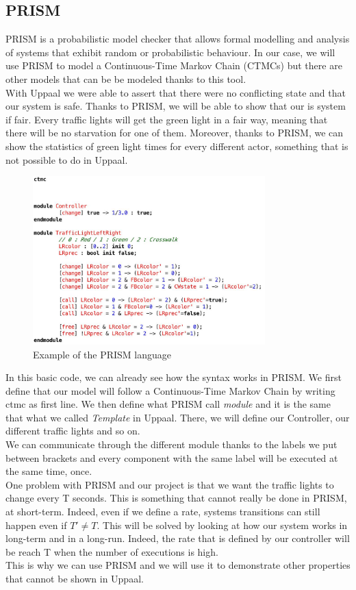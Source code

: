  \subsection{PRISM}
 PRISM is a probabilistic model checker that allows formal modelling and analysis of systems that exhibit random or probabilistic behaviour. In our case, we will use PRISM to model a Continuous-Time Markov Chain (CTMCs) but there are other models that can be be modeled thanks to this tool. \\
 With Uppaal we were able to assert that there were no conflicting state and that our system is safe. Thanks to PRISM, we will be able to show that our is system if fair. Every traffic lights will get the green light in a fair way, meaning that there will be no starvation for one of them. Moreover, thanks to PRISM, we can show the statistics of green light times for every different actor, something that is not possible to do in Uppaal.
 
\begin{figure}[H]\label{fig:prism}
  \begin{center}
    \includegraphics[width=0.8\textwidth]{picture/prism.png}
    \caption{Example of the PRISM language}
  \end{center}
\end{figure} 

\noindent In this basic code, we can already see how the syntax works in PRISM. We first define that our model will follow a Continuous-Time Markov Chain by writing ctmc as first line. We then define what PRISM call \textit{module} and it is the same that what we called \textit{Template} in Uppaal. There, we will define our Controller, our different traffic lights and so on. \\
We can communicate through the different module thanks to the labels we put between brackets and every component with the same label will be executed at the same time, once. \\
One problem with PRISM and our project is that we want the traffic lights to change every T seconds. This is something that cannot really be done in PRISM, at short-term. Indeed, even if we define a rate, systems transitions can still happen even if $T' \ne T $. This will be solved by looking at how our system works in long-term and in a long-run. Indeed, the rate that is defined by our controller will be reach T when the number of executions is high. \\ 
This is why we can use PRISM and we will use it to demonstrate other properties that cannot be shown in Uppaal.
